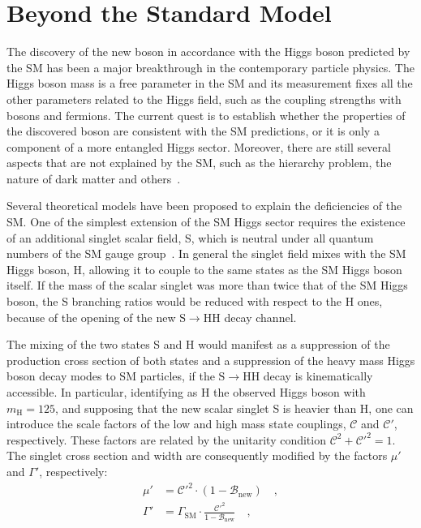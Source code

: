 \section{Beyond the Standard Model}
\label{sec:BSM}

The discovery of the new boson in accordance with the Higgs boson predicted by the SM has been a major breakthrough in the contemporary particle physics. The Higgs boson mass is a free parameter in the SM and its measurement fixes all the other parameters related to the Higgs field, such as the coupling strengths with bosons and fermions. The current quest is to establish whether the properties of the discovered boson are consistent with the SM predictions, or it is only a component of a more entangled Higgs sector. Moreover, there are still several aspects that are not explained by the SM, such as the hierarchy problem, the nature of dark matter and others~\cite{Langacker:2010zza}.

Several theoretical models have been proposed to explain the deficiencies of the SM. One of the simplest extension of the SM Higgs sector requires the existence of an additional singlet scalar field, S, which is neutral under all quantum numbers of the SM gauge group~\cite{Robens:2015gla}. In general the singlet field mixes with the SM Higgs boson, H, allowing it to couple to the same states as the SM Higgs boson itself. If the mass of the scalar singlet was more than twice that of the SM Higgs boson, the S branching ratios would be reduced with respect to the H ones, because of the opening of the new $\mathrm{S \to HH}$ decay channel.

The mixing of the two states S and H would manifest as a suppression of the production cross section of both states and a suppression of the heavy mass Higgs boson decay modes to SM particles, if the $\mathrm{S \to HH}$ decay is kinematically accessible. In particular, identifying as H the observed Higgs boson with $m_\mathrm{H} = 125$\GeV, and supposing that the new scalar singlet S is heavier than H, one can introduce the scale factors of the low and high mass state couplings, $\mathcal{C}$ and $\mathcal{C'}$, respectively. These factors are related by the unitarity condition $\mathcal{C}^2 + \mathcal{C'}^2 = 1$. The singlet cross section and width are consequently modified by the factors $\mu'$ and $\Gamma'$, respectively:
\begin{equation}
\begin{split}
\mu' &= \mathcal{C'}^2 \cdot (1 - \mathcal{B}_\mathrm{new}) \quad ,\\
\Gamma' &= \Gamma_\mathrm{SM} \cdot \frac{\mathcal{C'}^2}{1 - \mathcal{B}_\mathrm{new}} \quad ,
\end{split}
\end{equation}

